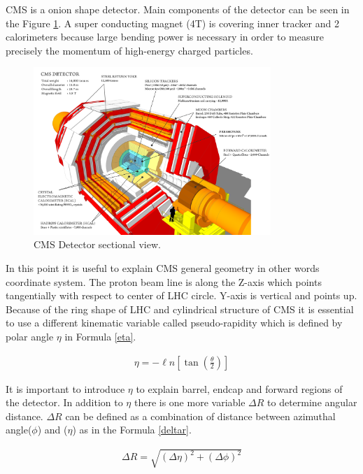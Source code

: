 \documentclass[12pt,oneandhalf,chaparabic,phys,ms,eng]{metu}
\begin{document}
CMS is a onion shape detector. Main components of the detector can be seen in the Figure \ref{CMS}. A super conducting magnet (4T) is covering inner tracker and 2 calorimeters because large bending power is necessary in order to measure precisely the momentum of high-energy charged particles.

\begin{figure}  [!hbt]
\centering
    \includegraphics[width=0.8\textwidth]{CMS}
    \caption{\label{CMS}CMS Detector sectional view. ~\cite{R2}}
\end{figure}

In this point it is useful to explain CMS general geometry in other words coordinate system. The proton beam line is along the Z-axis which points tangentially with respect to center of LHC circle. Y-axis is vertical and points up. Because of the ring shape of LHC and cylindrical structure of CMS it is essential to use a different kinematic variable called pseudo-rapidity which is defined by polar angle $\eta$ in Formula \ref{eta}.

\begin{eqnarray}
\label{eta}
	\eta=-\ell n [\tan(\frac{\theta}{2})]
\end{eqnarray}

It is important to introduce $\eta$ to explain barrel, endcap and forward regions of the detector. In addition to $\eta$ there is one more variable $\Delta R$ to determine angular distance. $\Delta R$ can be defined as a combination of distance between azimuthal angle($\phi$) and ($\eta$) as in the Formula \ref{deltar}.

\begin{eqnarray}
\label{deltar}
	\Delta R = \sqrt{(\Delta\eta)^2 + (\Delta\phi)^2}
\end{eqnarray}
\end{document}
